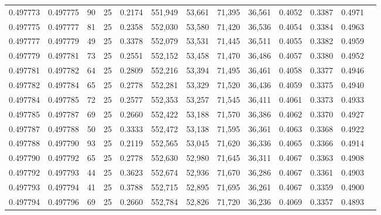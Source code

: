 \begin{tabular}{rrrrrrrrrrrrr}
0.497773 & 0.497775 &    90 &  25 &                                     0.2174 & 551,949 &  53,661 &  71,395 &  36,561 & 0.4052 & 0.3387 & 0.4971 \\
0.497775 & 0.497777 &    81 &  25 &                                     0.2358 & 552,030 &  53,580 &  71,420 &  36,536 & 0.4054 & 0.3384 & 0.4963 \\
0.497777 & 0.497779 &    49 &  25 &                                     0.3378 & 552,079 &  53,531 &  71,445 &  36,511 & 0.4055 & 0.3382 & 0.4959 \\
0.497779 & 0.497781 &    73 &  25 &                                     0.2551 & 552,152 &  53,458 &  71,470 &  36,486 & 0.4057 & 0.3380 & 0.4952 \\
0.497781 & 0.497782 &    64 &  25 &                                     0.2809 & 552,216 &  53,394 &  71,495 &  36,461 & 0.4058 & 0.3377 & 0.4946 \\
0.497782 & 0.497784 &    65 &  25 &                                     0.2778 & 552,281 &  53,329 &  71,520 &  36,436 & 0.4059 & 0.3375 & 0.4940 \\
0.497784 & 0.497785 &    72 &  25 &                                     0.2577 & 552,353 &  53,257 &  71,545 &  36,411 & 0.4061 & 0.3373 & 0.4933 \\
0.497785 & 0.497787 &    69 &  25 &                                     0.2660 & 552,422 &  53,188 &  71,570 &  36,386 & 0.4062 & 0.3370 & 0.4927 \\
0.497787 & 0.497788 &    50 &  25 &                                     0.3333 & 552,472 &  53,138 &  71,595 &  36,361 & 0.4063 & 0.3368 & 0.4922 \\
0.497788 & 0.497790 &    93 &  25 &                                     0.2119 & 552,565 &  53,045 &  71,620 &  36,336 & 0.4065 & 0.3366 & 0.4914 \\
0.497790 & 0.497792 &    65 &  25 &                                     0.2778 & 552,630 &  52,980 &  71,645 &  36,311 & 0.4067 & 0.3363 & 0.4908 \\
0.497792 & 0.497793 &    44 &  25 &                                     0.3623 & 552,674 &  52,936 &  71,670 &  36,286 & 0.4067 & 0.3361 & 0.4903 \\
0.497793 & 0.497794 &    41 &  25 &                                     0.3788 & 552,715 &  52,895 &  71,695 &  36,261 & 0.4067 & 0.3359 & 0.4900 \\
0.497794 & 0.497796 &    69 &  25 &                                     0.2660 & 552,784 &  52,826 &  71,720 &  36,236 & 0.4069 & 0.3357 & 0.4893 \\

\end{tabular}
